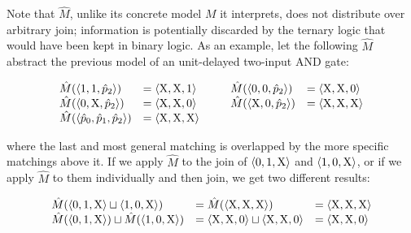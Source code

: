 
Note that $\hat M$, unlike its concrete model $M$ it interprets, does not distribute over arbitrary join; information is potentially discarded by the ternary logic that would have been kept in binary logic. As an example, let the following $\hat M$ abstract the previous model of an unit-delayed two-input AND gate:


\begin{equation*}
\begin{array}{llll}
  \hat M(\langle 1, 1, \hat p_{2} \rangle) & = \langle \mathrm{X}, \mathrm{X}, 1 \rangle \qquad & \hat M(\langle 0, 0, \hat p_{2} \rangle) & = \langle \mathrm{X}, \mathrm{X}, 0 \rangle \\
  \hat M(\langle 0, \mathrm{X}, \hat p_{2} \rangle) & = \langle \mathrm{X}, \mathrm{X}, 0 \rangle & \hat M(\langle \mathrm{X}, 0, \hat p_{2} \rangle) & = \langle \mathrm{X}, \mathrm{X}, \mathrm{X} \rangle \\
  \hat M(\langle \hat p_{0}, \hat p_{1}, \hat p_{2} \rangle) & = \langle \mathrm{X}, \mathrm{X}, \mathrm{X} \rangle & &
\end{array}
\end{equation*}


\noindent where the last and most general matching is overlapped by the more specific matchings above it. If we apply $\hat M$ to the join of $\langle 0, 1, \mathrm{X} \rangle$ and $\langle 1, 0, \mathrm{X} \rangle$, or if we apply $\hat M$ to them individually and then join, we get two different results:

\begin{equation*}
\begin{array}{lll}
  \hat M(\langle 0, 1, \mathrm{X} \rangle \sqcup \langle 1, 0, \mathrm{X} \rangle) &= \hat M(\langle \mathrm{X}, \mathrm{X}, \mathrm{X} \rangle) &= \langle \mathrm{X}, \mathrm{X}, \mathrm{X} \rangle \\
  \hat M(\langle 0, 1, \mathrm{X} \rangle) \sqcup \hat M(\langle 1, 0, \mathrm{X} \rangle) &= \langle \mathrm{X}, \mathrm{X}, 0 \rangle \sqcup \langle \mathrm{X}, \mathrm{X}, 0 \rangle &= \langle \mathrm{X}, \mathrm{X}, 0 \rangle
\end{array}
\end{equation*}

